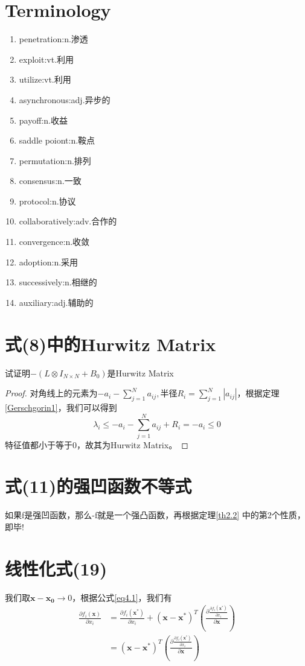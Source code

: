 \documentclass[lang=cn,10pt]{elegantbook}
\newcommand\bv[1]{\boldsymbol{#1}}
\begin{document}
\section{Terminology}
\begin{enumerate}
	\item penetration:n.渗透
	\item exploit:vt.利用
	\item utilize:vt.利用
	\item asynchronous:adj.异步的
	\item payoff:n.收益
	\item saddle poiont:n.鞍点
	\item permutation:n.排列
	\item consensus:n.一致
	\item protocol:n.协议
	\item collaboratively:adv.合作的
	\item convergence:n.收敛
	\item adoption:n.采用
	\item successively:n.相继的
	\item auxiliary:adj.辅助的
\end{enumerate}

\section{式(8)中的Hurwitz Matrix}
试证明$-(L\otimes I_{N\times N}+B_{0})$是Hurwitz Matrix
\begin{proof}
	对角线上的元素为$-a_{i}-\sum_{j=1}^{N}a_{ij},半径R_i = \sum_{j=1}^{N}|a_{ij}|$，根据定理\ref{Gerschgorin1}，我们可以得到
	\begin{equation*}
		\lambda_i \leq -a_{i}-\sum_{j=1}^{N}a_{ij} + R_i = -a_{i}\leq 0
	\end{equation*}
	特征值都小于等于0，故其为Hurwitz Matrix。
\end{proof}

\section{式(11)的强凹函数不等式}
如果f是强凹函数，那么-f就是一个强凸函数，再根据定理\ref{th2.2}
中的第2个性质，即毕!



\section{线性化式(19)}
我们取$\bv{x-x_0} \rightarrow 0$，根据公式\ref{eq4.1}，我们有
\begin{equation*}
	\begin{aligned}
		\frac{\partial f_i(\bv{x})}{\partial x_i} & = \frac{\partial f_i(\bv{x^{*}})}{\partial x_i} +
		(\bv{x-x^{*}})^T(\frac{\partial \frac{\partial f_i(\bv{x^{*}})}{\partial x_i}}{\partial \bv{x}}) \\
		                                          & =
		(\bv{x-x^{*}})^T(\frac{\partial \frac{\partial f_i(\bv{x^{*}})}{\partial x_i}}{\partial \bv{x}})
	\end{aligned}
\end{equation*}
\end{document}
